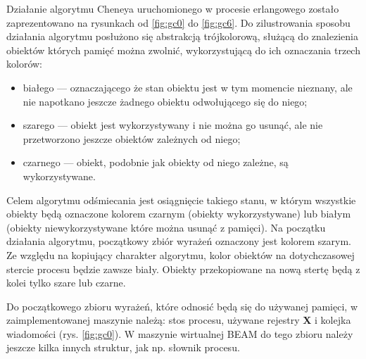 Działanie algorytmu Cheneya uruchomionego w procesie erlangowego zostało zaprezentowano na rysunkach od \ref{fig:gc0} do \ref{fig:gc6}.
Do zilustrowania sposobu działania algorytmu posłużono się abstrakcją trójkolorową, służącą do znalezienia obiektów których pamięć można zwolnić, wykorzystującą do ich oznaczania trzech kolorów:
\begin{itemize}
\item białego --- oznaczającego że stan obiektu jest w tym momencie nieznany, ale nie napotkano jeszcze żadnego obiektu odwołującego się do niego;
\item szarego --- obiekt jest wykorzystywany i nie można go usunąć, ale nie przetworzono jeszcze obiektów zależnych od niego;
\item czarnego --- obiekt, podobnie jak obiekty od niego zależne, są wykorzystywane.
\end{itemize}
Celem algorytmu odśmiecania jest osiągnięcie takiego stanu, w którym wszystkie obiekty będą oznaczone kolorem czarnym (obiekty wykorzystywane) lub białym (obiekty niewykorzystywane które można usunąć z pamięci).
Na początku działania algorytmu, początkowy zbiór wyrażeń oznaczony jest kolorem szarym.
Ze względu na kopiujący charakter algorytmu, kolor obiektów na dotychczasowej stercie procesu będzie zawsze biały.
Obiekty przekopiowane na nową stertę będą z kolei tylko szare lub czarne.

Do początkowego zbioru wyrażeń, które odnosić będą się do używanej pamięci, w zaimplementowanej maszynie należą:
stos procesu, używane rejestry \textbf{X} i kolejka wiadomości (rys. \ref{fig:gc0}). W maszynie wirtualnej BEAM do tego zbioru należy jeszcze kilka innych struktur, jak np. słownik procesu.

